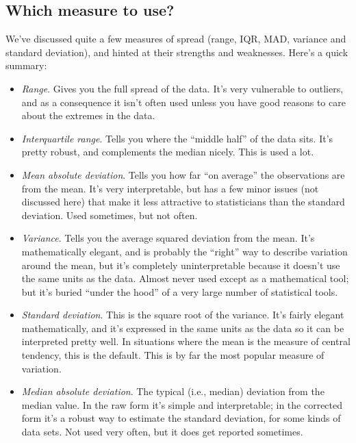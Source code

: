 \documentclass[
]{book}
\providecommand{\tightlist}{%
  \setlength{\itemsep}{0pt}\setlength{\parskip}{0pt}}
\begin{document}
\hypertarget{which-measure-to-use}{%
\subsection{Which measure to use?}\label{which-measure-to-use}}

We've discussed quite a few measures of spread (range, IQR, MAD, variance and standard deviation), and hinted at their strengths and weaknesses. Here's a quick summary:

\begin{itemize}
\tightlist
\item
  \emph{Range}. Gives you the full spread of the data. It's very vulnerable to outliers, and as a consequence it isn't often used unless you have good reasons to care about the extremes in the data.
\item
  \emph{Interquartile range}. Tells you where the ``middle half'' of the data sits. It's pretty robust, and complements the median nicely. This is used a lot.
\item
  \emph{Mean absolute deviation}. Tells you how far ``on average'' the observations are from the mean. It's very interpretable, but has a few minor issues (not discussed here) that make it less attractive to statisticians than the standard deviation. Used sometimes, but not often.
\item
  \emph{Variance}. Tells you the average squared deviation from the mean. It's mathematically elegant, and is probably the ``right'' way to describe variation around the mean, but it's completely uninterpretable because it doesn't use the same units as the data. Almost never used except as a mathematical tool; but it's buried ``under the hood'' of a very large number of statistical tools.
\item
  \emph{Standard deviation}. This is the square root of the variance. It's fairly elegant mathematically, and it's expressed in the same units as the data so it can be interpreted pretty well. In situations where the mean is the measure of central tendency, this is the default. This is by far the most popular measure of variation.
\item
  \emph{Median absolute deviation}. The typical (i.e., median) deviation from the median value. In the raw form it's simple and interpretable; in the corrected form it's a robust way to estimate the standard deviation, for some kinds of data sets. Not used very often, but it does get reported sometimes.
\end{itemize}
\end{document}

